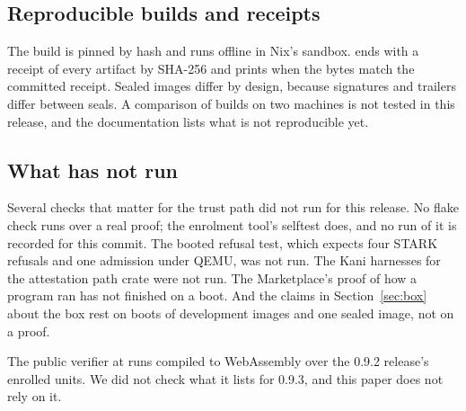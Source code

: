 \subsection{Reproducible builds and receipts}

The build is pinned by hash and runs offline in Nix's sandbox.  ends with a receipt of every artifact by SHA-256 and prints  when the bytes match the committed receipt. Sealed images differ by design, because signatures and trailers differ between seals. A comparison of builds on two machines is not tested in this release, and the documentation lists what is not reproducible yet.

\subsection{What has not run}

Several checks that matter for the trust path did not run for this release. No flake check runs  over a real proof; the enrolment tool's selftest does, and no run of it is recorded for this commit. The booted refusal test, which expects four STARK refusals and one admission under QEMU, was not run. The Kani harnesses for the attestation path crate were not run. The Marketplace's proof of how a program ran has not finished on a boot. And the claims in Section~\ref{sec:box} about the box rest on boots of development images and one sealed image, not on a proof.

The public verifier at  runs  compiled to WebAssembly over the 0.9.2 release's enrolled units. We did not check what it lists for 0.9.3, and this paper does not rely on it.

